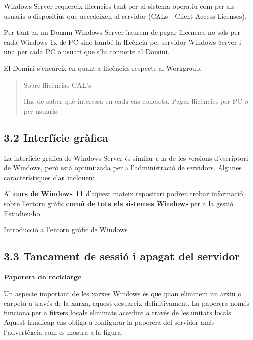 \documentclass[
  a4paper,
]{article}
\begin{document}
Windows Server requereix llicències tant per al sistema operatiu com per
als usuaris o dispositius que accedeixen al servidor (CALs - Client
Access Licenses).

Per tant en un Domini Windows Server haurem de pagar llicències no sols
per cada Windows 1x de PC sinó també la llicència per servidor Windows
Server i una per cada PC o usuari que s'hi connecte al Domini.

El Domini s'encareix en quant a llicències respecte al Workgroup.

\begin{quote}
Sobre llicèncias CAL's

Has de saber què interessa en cada cas concreta. Pagar llicències per PC
o per usuaris.
\end{quote}

\subsection{3.2 Interfície gràfica}\label{interfuxedcie-gruxe0fica}

La interfície gràfica de Windows Server és similar a la de les versions
d'escriptori de Windows, però està optimitzada per a l'administració de
servidors. Algunes característiques clau inclouen:

Al \textbf{curs de Windows 11} d'aquest mateix repositori podreu trobar
informació sobre l'entorn gràfic \textbf{comú de tots els sistemes
Windows} per a la gestió. Estudieu-ho.

\href{https://tofermos.github.io/Windows11/interfaces/interfaces.html}{Introducció
a l'entorn gràfic de Windows}

\subsection{3.3 Tancament de sessió i apagat del
servidor}\label{tancament-de-sessiuxf3-i-apagat-del-servidor}

\textbf{Paperera de reciclatge}

Un aspecte important de les xarxes Windows és que quan eliminem un arxiu
o carpeta a través de la xarxa, aquest despareix definitivament. La
paperera només funciona per a fitxers locals eliminats accedint a través
de les unitats locals. Aquest handicap ens obliga a configurar la
paperera del servidor amb l'advertència com es mostra a la figura:
\end{document}
